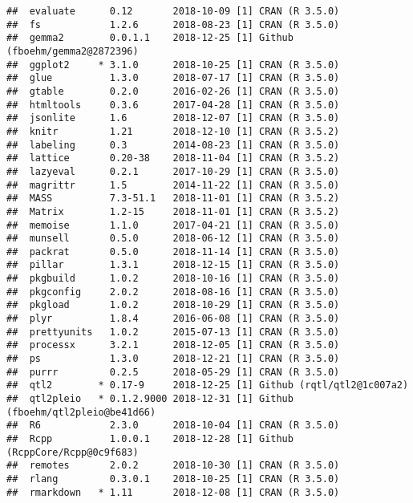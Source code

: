 \documentclass[oneside]{book}
\begin{document}
\begin{verbatim}
##  evaluate      0.12       2018-10-09 [1] CRAN (R 3.5.0)                   
##  fs            1.2.6      2018-08-23 [1] CRAN (R 3.5.0)                   
##  gemma2        0.0.1.1    2018-12-25 [1] Github (fboehm/gemma2@2872396)   
##  ggplot2     * 3.1.0      2018-10-25 [1] CRAN (R 3.5.0)                   
##  glue          1.3.0      2018-07-17 [1] CRAN (R 3.5.0)                   
##  gtable        0.2.0      2016-02-26 [1] CRAN (R 3.5.0)                   
##  htmltools     0.3.6      2017-04-28 [1] CRAN (R 3.5.0)                   
##  jsonlite      1.6        2018-12-07 [1] CRAN (R 3.5.0)                   
##  knitr         1.21       2018-12-10 [1] CRAN (R 3.5.2)                   
##  labeling      0.3        2014-08-23 [1] CRAN (R 3.5.0)                   
##  lattice       0.20-38    2018-11-04 [1] CRAN (R 3.5.2)                   
##  lazyeval      0.2.1      2017-10-29 [1] CRAN (R 3.5.0)                   
##  magrittr      1.5        2014-11-22 [1] CRAN (R 3.5.0)                   
##  MASS          7.3-51.1   2018-11-01 [1] CRAN (R 3.5.2)                   
##  Matrix        1.2-15     2018-11-01 [1] CRAN (R 3.5.2)                   
##  memoise       1.1.0      2017-04-21 [1] CRAN (R 3.5.0)                   
##  munsell       0.5.0      2018-06-12 [1] CRAN (R 3.5.0)                   
##  packrat       0.5.0      2018-11-14 [1] CRAN (R 3.5.0)                   
##  pillar        1.3.1      2018-12-15 [1] CRAN (R 3.5.0)                   
##  pkgbuild      1.0.2      2018-10-16 [1] CRAN (R 3.5.0)                   
##  pkgconfig     2.0.2      2018-08-16 [1] CRAN (R 3.5.0)                   
##  pkgload       1.0.2      2018-10-29 [1] CRAN (R 3.5.0)                   
##  plyr          1.8.4      2016-06-08 [1] CRAN (R 3.5.0)                   
##  prettyunits   1.0.2      2015-07-13 [1] CRAN (R 3.5.0)                   
##  processx      3.2.1      2018-12-05 [1] CRAN (R 3.5.0)                   
##  ps            1.3.0      2018-12-21 [1] CRAN (R 3.5.0)                   
##  purrr         0.2.5      2018-05-29 [1] CRAN (R 3.5.0)                   
##  qtl2        * 0.17-9     2018-12-25 [1] Github (rqtl/qtl2@1c007a2)       
##  qtl2pleio   * 0.1.2.9000 2018-12-31 [1] Github (fboehm/qtl2pleio@be41d66)
##  R6            2.3.0      2018-10-04 [1] CRAN (R 3.5.0)                   
##  Rcpp          1.0.0.1    2018-12-28 [1] Github (RcppCore/Rcpp@0c9f683)   
##  remotes       2.0.2      2018-10-30 [1] CRAN (R 3.5.0)                   
##  rlang         0.3.0.1    2018-10-25 [1] CRAN (R 3.5.0)                   
##  rmarkdown   * 1.11       2018-12-08 [1] CRAN (R 3.5.0)                   

\end{verbatim}
\end{document}
